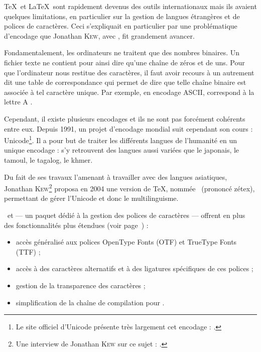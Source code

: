 \TeX\ et \LaTeX\ sont rapidement devenus des outils internationaux mais ils avaient quelques limitations, en particulier sur la gestion de langues étrangères et de polices de caractères. Ceci s'expliquait en particulier par une problématique d'encodage que Jonathan \textsc{Kew}, avec \XeTeX, fit grandement avancer.

Fondamentalement, les ordinateurs ne traitent que des nombres binai\-res. Un fichier texte ne contient pour ainsi dire qu'une chaîne de zéros et de uns. Pour que l'ordinateur nous restitue des caractères, il faut avoir recours à un  autrement dit une table de correspondance qui permet de dire que telle chaîne binaire est associée à tel caractère unique. Par exemple, en encodage ASCII,  \fg{} correspond à la lettre \og A \fg{}. 

Cependant, il existe plusieurs encodages et ils ne sont pas forcément cohérents entre eux. Depuis 1991, un projet d'encodage mondial suit cependant son cours : Unicode\footnote{Le site officiel d'Unicode présente très largement cet encodage : .}. Il a pour but de traiter les différents langues de l'humanité en un unique encodage : s'y retrouvent des langues aussi variées que le japonais, le tamoul, le tagalog, le khmer.%

Du fait de ses travaux l'amenant à travailler avec des langues asiatiques, Jonathan \textsc{Kew}\footnote{Une interview de Jonathan \textsc{Kew} sur ce sujet : .} proposa en 2004 une version de \TeX, nommée \XeTeX\ (prononcé \og zétex\fg), permettant de gérer l'Unicode et donc le multilinguisme.

\XeTeX\ et  --- un paquet dédié à la gestion des polices de caractères --- offrent en plus des fonctionnalités plus étendues (voir page~\pageref{fontes}) :
\begin{itemize}
\item accès généralisé aux polices OpenType Fonts (OTF) et TrueType Fonts (TTF) ;
\item accès à des caractères alternatifs et à des ligatures spécifiques de ces polices ;
\item gestion de la transparence des caractères ;
\item simplification de la chaîne de compilation pour .
\end{itemize}

